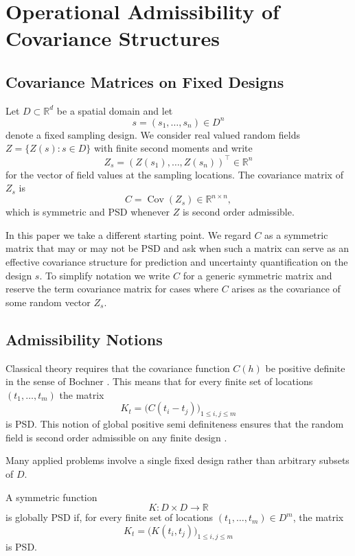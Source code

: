 \documentclass[smallextended]{svjour3}
\newcommand{\R}{\mathbb{R}}
\newcommand{\T}{\top}
\newcommand{\1}{\mathbf{1}}
\DeclareMathOperator{\Cov}{Cov}
\begin{document}
\section{Operational Admissibility of Covariance Structures}
\label{sec:admissibility}

\subsection{Covariance Matrices on Fixed Designs}

Let $D \subset \R^d$ be a spatial domain and let
\[
s = (s_1,\dots,s_n) \in D^n
\]
denote a fixed sampling design. We consider real valued random fields $Z = \{Z(s) : s \in D\}$ with finite second moments and write
\[
Z_s = (Z(s_1),\dots,Z(s_n))^{\T} \in \R^n
\]
for the vector of field values at the sampling locations. The covariance matrix of $Z_s$ is
\[
C = \Cov(Z_s) \in \R^{n \times n},
\]
which is symmetric and PSD whenever $Z$ is second order admissible.

In this paper we take a different starting point. We regard $C$ as a symmetric matrix that may or may not be PSD and ask when such a matrix can serve as an effective covariance structure for prediction and uncertainty quantification on the design $s$. To simplify notation we write $C$ for a generic symmetric matrix and reserve the term covariance matrix for cases where $C$ arises as the covariance of some random vector $Z_s$.

\subsection{Admissibility Notions}

Classical theory requires that the covariance function $C(h)$ be positive definite in the sense of Bochner \citep{Bochner2005}. This means that for every finite set of locations $(t_1,\dots,t_m)$ the matrix 
\[
K_{t} = \bigl(C(t_i - t_j)\bigr)_{1 \leq i,j \leq m}
\]
is PSD. This notion of global positive semi definiteness ensures that the random field is second order admissible on any finite design \citep[cf.][]{Bochner2005,yaglom1987}.
 
Many applied problems involve a single fixed design rather than arbitrary subsets of $D$.

\begin{definition}
	A symmetric function 
		\[
		K : D \times D \to \R
		\]
	 is globally PSD if, for every finite set of locations $(t_1,\dots,t_m) \in D^m$, the matrix
	\[
	K_{t} = \bigl(K(t_i,t_j)\bigr)_{1 \leq i,j \leq m}
	\]
	is PSD.
\end{definition}
\end{document}
